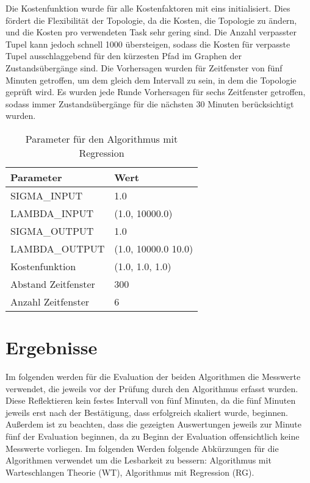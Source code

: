 Die Kostenfunktion wurde für alle Kostenfaktoren mit eins initialisiert.
Dies fördert die Flexibilität der Topologie, da die Kosten, die Topologie zu ändern, und die Kosten pro verwendeten Task sehr gering sind.
Die Anzahl verpasster Tupel kann jedoch schnell 1000 übersteigen, sodass die Kosten für verpasste Tupel ausschlaggebend für den kürzesten Pfad im Graphen der Zustandsübergänge sind.
Die Vorhersagen wurden für Zeitfenster von fünf Minuten getroffen, um dem gleich dem Intervall zu sein, in dem die Topologie geprüft wird.
Es wurden jede Runde Vorhersagen für sechs Zeitfenster getroffen, sodass immer Zustandsübergänge für die nächsten 30 Minuten berücksichtigt wurden.

\begin{table}
\caption{Parameter für den Algorithmus mit Regression} 
\centering
\begin{tabular}{ll}
\hline
\textbf{Parameter} & \textbf{Wert} \\ \hline
SIGMA\_INPUT & 1.0 \\
LAMBDA\_INPUT & (1.0, 10000.0) \\
SIGMA\_OUTPUT & 1.0 \\
LAMBDA\_OUTPUT & (1.0, 10000.0 10.0) \\
Kostenfunktion & (1.0, 1.0, 1.0) \\
Abstand Zeitfenster & 300 \\
Anzahl Zeitfenster & 6 \\
\hline
\end{tabular}
\end{table}

\section{Ergebnisse}

Im folgenden werden für die Evaluation der beiden Algorithmen die Messwerte verwendet, die jeweils vor der Prüfung durch den Algorithmus erfasst wurden.
Diese Reflektieren kein festes Intervall von fünf Minuten, da die fünf Minuten jeweils erst nach der Bestätigung, dass erfolgreich skaliert wurde, beginnen.
Außerdem ist zu beachten, dass die gezeigten Auswertungen jeweils zur Minute fünf der Evaluation beginnen, da zu Beginn der Evaluation offensichtlich keine Messwerte vorliegen.
Im folgenden Werden folgende Abkürzungen für die Algorithmen verwendet um die Lesbarkeit zu bessern:
Algorithmus mit Warteschlangen Theorie (WT), Algorithmus mit Regression (RG).

